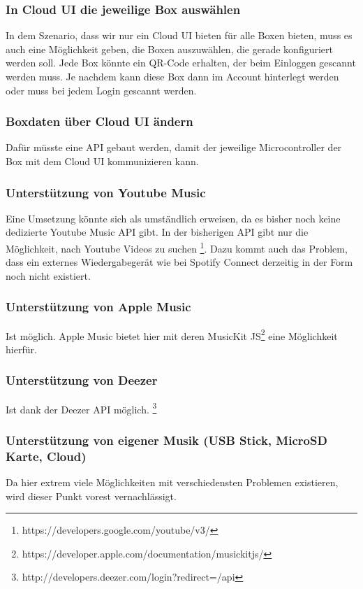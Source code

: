 \documentclass[10pt, a4paper, draft]{article}
\begin{document}
\subsubsection{In Cloud UI die jeweilige Box auswählen}
In dem Szenario, dass wir nur ein Cloud UI bieten für alle Boxen bieten, muss es auch eine Möglichkeit geben, die Boxen auszuwählen, die gerade konfiguriert werden soll.
Jede Box könnte ein QR-Code erhalten, der beim Einloggen gescannt werden muss. Je nachdem kann diese Box dann im Account hinterlegt werden oder muss bei jedem Login gescannt werden.

\subsubsection{Boxdaten über Cloud UI ändern}
Dafür müsste eine API gebaut werden, damit der jeweilige Microcontroller der Box mit dem Cloud UI kommunizieren kann.

\subsubsection{Unterstützung von Youtube Music}
Eine Umsetzung könnte sich als umständlich erweisen, da es bisher noch keine dedizierte Youtube Music API gibt. In der bisherigen API gibt nur die Möglichkeit, nach Youtube Videos zu suchen \footnote{https://developers.google.com/youtube/v3/}. Dazu kommt auch das Problem, dass ein externes Wiedergabegerät wie bei Spotify Connect derzeitig in der Form noch nicht existiert.
\subsubsection{Unterstützung von Apple Music}
Ist möglich. Apple Music bietet hier mit deren MusicKit JS\footnote{https://developer.apple.com/documentation/musickitjs/} eine Möglichkeit hierfür.
\subsubsection{Unterstützung von Deezer}
Ist dank der Deezer API möglich. \footnote{http://developers.deezer.com/login?redirect=/api}
\subsubsection{Unterstützung von eigener Musik (USB Stick, MicroSD Karte, Cloud)}
Da hier extrem viele Möglichkeiten mit verschiedensten Problemen existieren, wird dieser Punkt vorest vernachlässigt.
\end{document}
